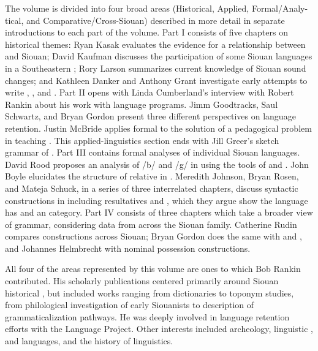 \begin{refsection}
The volume is divided into four broad areas (Historical, Applied, Formal/Analy-tical, and Comparative/Cross-Siouan) described in more detail in separate introductions to each part of the volume. Part I consists of five chapters on historical themes: Ryan Kasak evaluates the evidence for a relationship between  and Siouan; David Kaufman discusses the participation of some Siouan languages in a Southeastern ; Rory Larson summarizes current knowledge of Siouan sound changes; and Kathleen Danker and Anthony Grant investigate early attempts to write , , and .  Part II opens with Linda Cumberland's interview with Robert Rankin about his work with  language programs. Jimm Goodtracks, Saul Schwartz, and Bryan Gordon present three different perspectives on  language retention. Justin McBride applies formal  to the solution of a pedagogical problem in teaching . This applied-linguistics section ends with Jill Greer's sketch grammar of . Part III contains formal analyses of individual Siouan languages. David Rood proposes an analysis of /b/ and /g/ in  using the tools of  and . John Boyle elucidates the structure of relative  in . Meredith Johnson, Bryan Rosen, and Mateja Schuck, in a series of three interrelated chapters, discuss syntactic constructions in  including resultatives and  , which they argue show the language has  and an  category. Part IV consists of three chapters which take a broader view of grammar, considering data from across the Siouan family. Catherine Rudin compares  constructions across Siouan; Bryan Gordon does the same with  and , and Johannes Helmbrecht with nominal possession constructions. 

All four of the areas represented by this volume are ones to which Bob Rankin contributed. His scholarly publications centered primarily around Siouan historical , but included works ranging from dictionaries to toponym studies, from philological investigation of early Siouanists  to description of grammaticalization pathways. He was deeply involved in language retention efforts with the  Language Project. Other interests included archeology, linguistic ,  and  languages, and the history of linguistics. 


\end{refsection}
